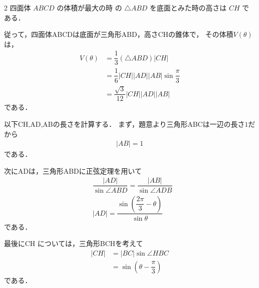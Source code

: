 \documentclass[../../main.tex]{subfiles}
\begin{document}
\begin{multicols}{2}
  四面体 $ABCD$ の体積が最大の時
  の $\triangle ABD$ を底面とみた時の高さは $CH$ である．

  従って，四面体ABCDは底面が三角形ABD，高さCHの錐体で，
  その体積$V(\theta)$は，
  \begin{align}
    V(\theta)
    & = \dfrac{1}{3}(\triangle ABD) |CH|          \\
    & = \dfrac{1}{6}|CH||AD||AB|\sin\dfrac{\pi}{3} \\
    & = \dfrac{\sqrt{3}}{12}|CH||AD||AB|
  \end{align}
  である．

  以下CH,AD,ABの長さを計算する．
  まず，題意より三角形ABCは一辺の長さ$1$だから
  \begin{align}
    |AB| = 1
  \end{align}
  である．

  次にADは，三角形ABDに正弦定理を用いて
  \begin{align}
    & \dfrac{|AD|}{\sin \angle ABD } = \dfrac{|AB|}{\sin \angle ADB} \\
    & |AD| = \dfrac{\sin\left(\dfrac{2\pi}{3}-\theta\right)}{\sin\theta}
  \end{align}
  である．

  最後にCH については，三角形BCHを考えて
  \begin{align}
    |CH|
    & = |BC|\sin \angle HBC  \\
    & = \sin\left(\theta - \dfrac{\pi}{3}\right)
  \end{align}
  である．


\end{multicols}
\end{document}
